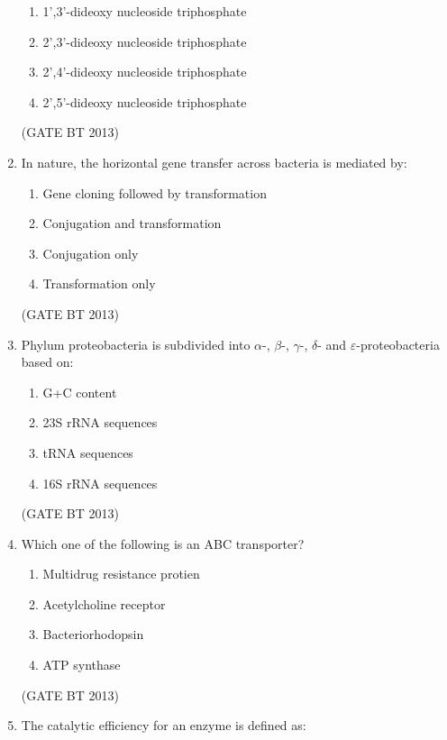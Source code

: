 \documentclass[journal,12pt,onecolumn]{IEEEtran}
\theoremstyle{remark}
\begin{document}
\begin{enumerate}
\begin{enumerate}[label=(\Alph*)]
    \item 1',3'-dideoxy nucleoside triphosphate
    \item 2',3'-dideoxy nucleoside triphosphate
    \item 2',4'-dideoxy nucleoside triphosphate
    \item 2',5'-dideoxy nucleoside triphosphate
\end{enumerate}
\hfill (GATE BT 2013)
\item 

In nature, the horizontal gene transfer across bacteria is mediated by:

\begin{enumerate}[label=(\Alph*)]
    \item Gene cloning followed by transformation
    \item Conjugation and transformation
    \item Conjugation only
    \item Transformation only
\end{enumerate} 
\hfill (GATE BT 2013)
\item 

Phylum proteobacteria is subdivided into $\alpha$-, $\beta$-, $\gamma$-, $\delta$- and $\varepsilon$-proteobacteria based on:

\begin{enumerate}[label=(\Alph*)]
    \item G+C content
    \item 23S rRNA sequences
    \item tRNA sequences
    \item 16S rRNA sequences
\end{enumerate}
\hfill (GATE BT 2013)
\item 

Which one of the following is an ABC transporter?

\begin{enumerate}[label=(\Alph*)]
    \item Multidrug resistance protien 
    \item Acetylcholine receptor
    \item Bacteriorhodopsin
    \item ATP synthase
\end{enumerate} 
\hfill (GATE BT 2013)
\item 

The catalytic efficiency for an enzyme is defined as:


\end{enumerate}
\end{document}
